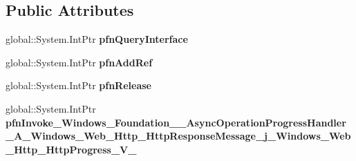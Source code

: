 \subsection*{Public Attributes}
\begin{DoxyCompactItemize}
\item 
\mbox{\label{struct_windows_1_1_foundation_1_1_async_operation_progress_handler___a___windows___web___http___de22f4531f01508213e1f7c66531e51a_a1248f4b08a280a259f1c52c41cb10a3f}} 
global\+::\+System.\+Int\+Ptr {\bfseries pfn\+Query\+Interface}
\item 
\mbox{\label{struct_windows_1_1_foundation_1_1_async_operation_progress_handler___a___windows___web___http___de22f4531f01508213e1f7c66531e51a_a5a5edf47c3fc0c093deb061211cd4339}} 
global\+::\+System.\+Int\+Ptr {\bfseries pfn\+Add\+Ref}
\item 
\mbox{\label{struct_windows_1_1_foundation_1_1_async_operation_progress_handler___a___windows___web___http___de22f4531f01508213e1f7c66531e51a_a7da8c92a23cd93c93157935d36bbffe3}} 
global\+::\+System.\+Int\+Ptr {\bfseries pfn\+Release}
\item 
\mbox{\label{struct_windows_1_1_foundation_1_1_async_operation_progress_handler___a___windows___web___http___de22f4531f01508213e1f7c66531e51a_a3e7d2aba84e6616d5bb5654ee528c7ca}} 
global\+::\+System.\+Int\+Ptr {\bfseries pfn\+Invoke\+\_\+\+Windows\+\_\+\+Foundation\+\_\+\+\_\+\+Async\+Operation\+Progress\+Handler\+\_\+\+A\+\_\+\+Windows\+\_\+\+Web\+\_\+\+Http\+\_\+\+Http\+Response\+Message\+\_\+j\+\_\+\+Windows\+\_\+\+Web\+\_\+\+Http\+\_\+\+Http\+Progress\+\_\+\+V\+\_\+}
\end{DoxyCompactItemize}
